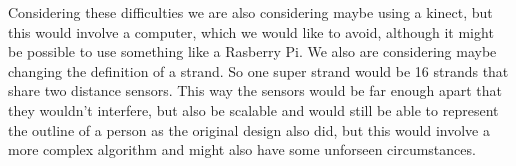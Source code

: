 \documentclass[10pt]{article}
\begin{document}
  Considering these difficulties we are also considering maybe using a kinect, but this would involve a computer, which we would like to avoid, although it might be possible to use something like a Rasberry Pi. We also are considering maybe changing the definition of a strand. So one super strand would be 16 strands that share two distance sensors. This way the sensors would be far enough apart that they wouldn't interfere, but also be scalable and would still be able to represent the outline of a person as the original design also did, but this would involve a more complex algorithm and might also have some unforseen circumstances.
\end{document}
